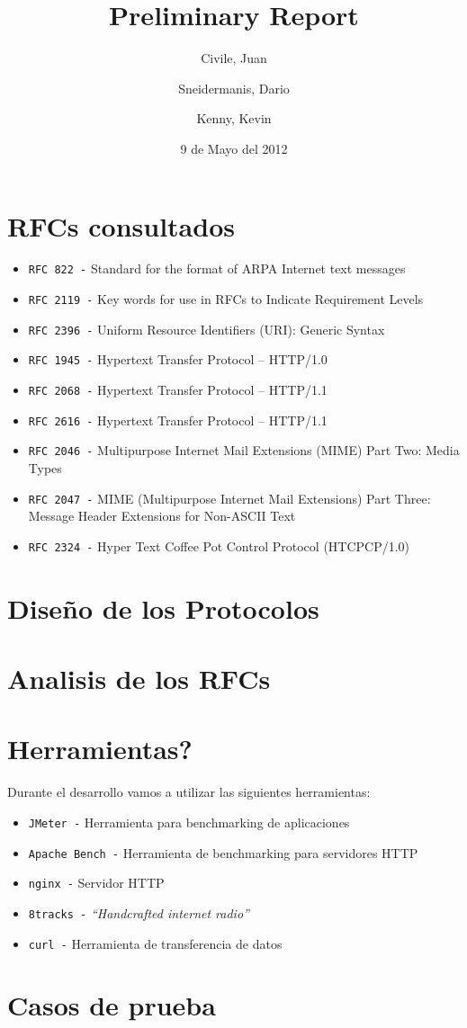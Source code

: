 \documentclass[11pt,a4paper,titlepage]{article}
\title{Preliminary Report}
\author{Civile, Juan \and Sneidermanis, Dario \and Kenny, Kevin}
\date{9 de Mayo del 2012}
\begin{document}
\newcommand{\awesome}[1]{\texttt{\large #1 -}}

\maketitle
\tableofcontents
\clearpage

\section{RFCs consultados}

\begin{itemize}

    \item \awesome{RFC 822}  Standard for the format of ARPA Internet text messages
    \item \awesome{RFC 2119} Key words for use in RFCs to Indicate Requirement Levels
    \item \awesome{RFC 2396} Uniform Resource Identifiers (URI): Generic Syntax
    \item \awesome{RFC 1945} Hypertext Transfer Protocol -- HTTP/1.0
    \item \awesome{RFC 2068} Hypertext Transfer Protocol -- HTTP/1.1
    \item \awesome{RFC 2616} Hypertext Transfer Protocol -- HTTP/1.1
    \item \awesome{RFC 2046} Multipurpose Internet Mail Extensions (MIME) Part Two: Media Types
    \item \awesome{RFC 2047} MIME (Multipurpose Internet Mail Extensions) Part Three: Message Header Extensions for Non-ASCII Text
    \item \awesome{RFC 2324} Hyper Text Coffee Pot Control Protocol (HTCPCP/1.0)

\end{itemize}

\section{Diseño de los Protocolos}

\section{Analisis de los RFCs}

\section{Herramientas?}
    Durante el desarrollo vamos a utilizar las siguientes herramientas:
    \begin{itemize}
        \item \awesome{JMeter} Herramienta para benchmarking de aplicaciones
        \item \awesome{Apache Bench} Herramienta de benchmarking para servidores HTTP
        \item \awesome{nginx} Servidor HTTP
        \item \awesome{8tracks} \emph{``Handcrafted internet radio''}
        \item \awesome{curl} Herramienta de transferencia de datos
    \end{itemize}

\section{Casos de prueba}
\end{document}
